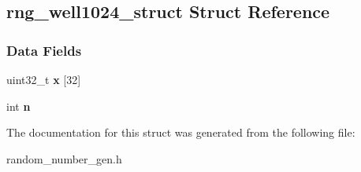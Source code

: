 \hypertarget{structrng__well1024__struct}{}\subsection{rng\+\_\+well1024\+\_\+struct Struct Reference}
\label{structrng__well1024__struct}
\subsubsection*{Data Fields}
\begin{DoxyCompactItemize}
\item 
\mbox{\label{structrng__well1024__struct_a8d407696371a130afedde3172b1c94ec}} 
uint32\+\_\+t {\bfseries x} \mbox{[}32\mbox{]}
\item 
\mbox{\label{structrng__well1024__struct_a93b390b05add2c9f1eceda50b634b6da}} 
int {\bfseries n}
\end{DoxyCompactItemize}


The documentation for this struct was generated from the following file\+:\begin{DoxyCompactItemize}
\item 
random\+\_\+number\+\_\+gen.\+h\end{DoxyCompactItemize}
